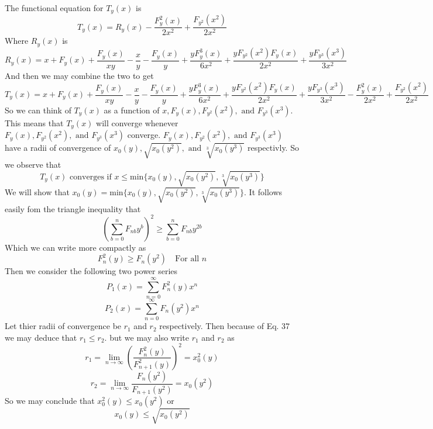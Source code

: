 \documentclass{article}
\begin{document}
The functional equation for \(T_y(x)\) is 
\begin{equation}
T_y(x)=R_y(x)-\frac{F_y^2(x)}{2x^2}+\frac{F_{y^2}(x^2)}{2x^2}
\end{equation}
Where \(R_y(x)\) is 
\begin{equation}
R_y(x)=x + F_y(x) +\frac{F_y(x)}{xy}-\frac{x}{y}-\frac{F_y(x)}{y}+\frac{yF_y^3(x)}{6x^2}+\frac{yF_{y^2}(x^2)F_y(x)}{2x^2}+\frac{yF_{y^3}(x^3)}{3x^2}
\end{equation}
And then we may combine the two to get 
\begin{equation}
T_y(x)=x + F_y(x) +\frac{F_y(x)}{xy}-\frac{x}{y}-\frac{F_y(x)}{y}+\frac{yF_y^3(x)}{6x^2}+\frac{yF_{y^2}(x^2)F_y(x)}{2x^2}+\frac{yF_{y^3}(x^3)}{3x^2}-\frac{F_y^2(x)}{2x^2}+\frac{F_{y^2}(x^2)}{2x^2}
\end{equation}
So we can think of \(T_y(x)\) as a function of \(x, F_y(x), F_{y^2}(x^2), \text{ and } F_{y^3}(x^3)\). This means that \(T_y(x)\) will converge whenever \(F_y(x), F_{y^2}(x^2), \text{ and } F_{y^3}(x^3)\) converge. \(F_y(x), F_{y^2}(x^2), \text{ and } F_{y^3}(x^3)\) have a radii of convergence of \(x_0(y),\sqrt{x_0(y^2)}, \text{ and } \sqrt[3]{x_0(y^3)}\) respectivly. So we observe that 
\[T_y(x) \text{ converges if } x \leq \text{min}\{x_0(y),\sqrt{x_0(y^2)}, \sqrt[3]{x_0(y^3)}\}\]
We will show that \(x_0(y)= \text{min}\{x_0(y),\sqrt{x_0(y^2)}, \sqrt[3]{x_0(y^3)}\}\). It follows easily fom the triangle inequality that 
\[\left(\sum_{b=0}^nF_{nb}y^b\right)^2 \geq \sum_{b=0}^nF_{nb}y^{2b}\]
Which we can write more compactly as 
\begin{equation}
F_n^2(y) \geq F_n(y^2) \quad \text{For all } n
\end{equation}
Then we consider the following two power series
\begin{equation}
P_1(x)=\sum_{n=0}^\infty F_n^2(y)x^n
\end{equation}
\begin{equation}
P_2(x)=\sum_{n=0}^\infty F_n(y^2)x^n
\end{equation}
Let thier radii of convergence be \(r_1\) and \(r_2\) respectively. Then because of Eq. 37 we may deduce that \(r_1\leq r_2\). but we may also write \(r_1\) and \(r_2\) as
\[r_1=\lim_{n \to \infty} \left(\frac{F_n^2(y)}{F_{n+1}^2(y)}\right)^2=x_0^2(y)\]
\[r_2=\lim_{n \to \infty} \frac{F_n(y^2)}{F_{n+1}(y^2)}=x_0(y^2)\]
So we may conclude that \(x_0^2(y) \leq x_0(y^2)\) or 
\begin{equation}
x_0(y) \leq \sqrt{x_0(y^2)}
\end{equation}
\end{document}
